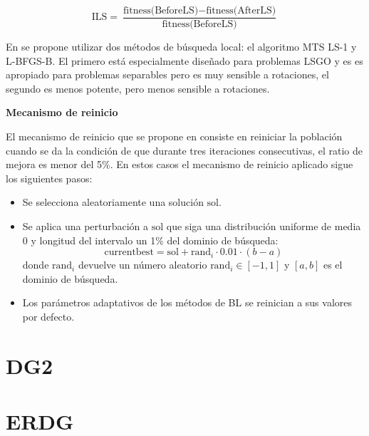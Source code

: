 \[
\text{ILS} = \frac{\text{fitness(BeforeLS)} - \text{fitness(AfterLS)}}{\text{fitness(BeforeLS)}}
\]

\vspace{10px}

En \cite{Molina2018} se propone utilizar dos métodos de búsqueda local: el algoritmo MTS LS-1 y L-BFGS-B. El primero está especialmente diseñado para problemas LSGO y es es apropiado para problemas separables pero es muy sensible a rotaciones, el segundo es menos potente, pero menos sensible a rotaciones.

\vspace{10px}

\noindent\textbf{Mecanismo de reinicio}

El mecanismo de reinicio que se propone en \citep{Molina2018} consiste en reiniciar la población cuando se da la condición de que durante tres iteraciones consecutivas, el ratio de mejora es menor del 5\%. En estos casos el mecanismo de reinicio aplicado sigue los siguientes pasos:

\begin{itemize}
    \item Se selecciona aleatoriamente una solución \( \text{sol} \).
    \item Se aplica una perturbación a \( \text{sol} \) que siga una distribución uniforme de media $0$ y longitud del intervalo un 1\% del dominio de búsqueda:
    \[
    \text{currentbest} = \text{sol} + \text{rand}_{i} \cdot 0.01 \cdot (b - a)
    \]
    donde \( \text{rand}_{i} \) devuelve un número aleatorio \( \text{rand}_{i} \in [-1, 1] \) y \( [a, b] \) es el dominio de búsqueda.
    \item Los parámetros adaptativos de los métodos de BL se reinician a sus valores por defecto.
\end{itemize}

\section{DG2}
\cite{DG2}
\section{ERDG}

\endinput
